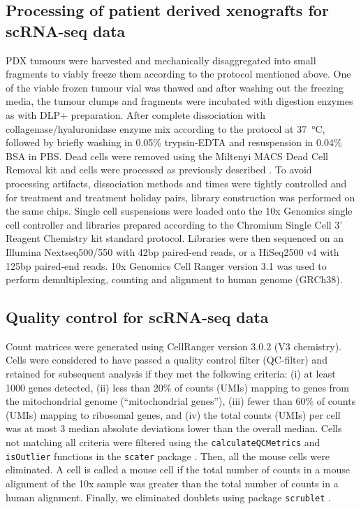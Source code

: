 \subsection{Processing of patient derived xenografts for scRNA-seq data}
PDX tumours were harvested and mechanically disaggregated into small fragments to viably freeze them according to the protocol mentioned above. 
One of the viable frozen tumour vial was thawed and after washing out the freezing media, the tumour clumps and fragments were incubated with digestion enzymes as with DLP+ preparation. After complete dissociation with collagenase/hyaluronidase enzyme mix according to the protocol at \SI{37}{\degreeCelsius}, followed by briefly washing in 0.05\% trypsin-EDTA and resuspension in 0.04\% BSA in PBS. Dead cells were removed using the Miltenyi MACS Dead Cell Removal kit and cells were processed as previously described \cite{o2019dissociation}.
To avoid processing artifacts, dissociation methods and times were tightly controlled and for treatment and treatment holiday pairs, library construction was performed on the same chips. Single cell suspensions were loaded onto the 10x Genomics single cell controller and libraries prepared according to the Chromium Single Cell 3’ Reagent Chemistry kit standard protocol. 
Libraries were then sequenced on an Illumina Nextseq500/550 with 42bp paired-end reads, or a HiSeq2500 v4 with 125bp paired-end reads. 10x Genomics Cell Ranger version 3.1 was used to perform demultiplexing,  counting and alignment to human genome (GRCh38).

\subsection{Quality control for scRNA-seq data}

Count matrices were generated using CellRanger version 3.0.2 (V3 chemistry). Cells were considered to have passed a quality control filter (QC-filter) and retained for subsequent analysis if they met the following criteria: (i) at least 1000 genes detected, (ii) less than 20\% of counts (UMIs) mapping to genes from the mitochondrial genome (``mitochondrial genes''), (iii) fewer than 60\% of counts (UMIs) mapping to ribosomal genes, and (iv) the total counts (UMIs) per cell was at most 3 median absolute deviations lower than the overall median. Cells not matching all criteria were filtered using the \texttt{calculateQCMetrics} and \texttt{isOutlier} functions in the \texttt{scater} package \cite{mccarthy2017scater}. Then, all the mouse cells were eliminated. A cell is called a mouse cell if the total number of counts in a mouse alignment of the 10x sample was greater than the total number of counts in a human alignment. Finally, we eliminated doublets using package \texttt{scrublet} \cite{scrublet}.

